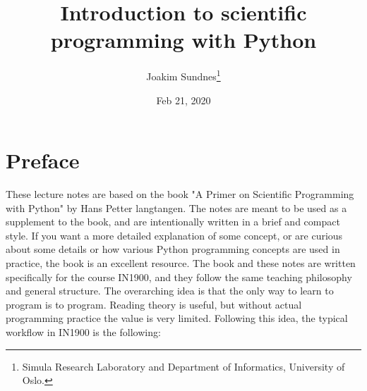 \documentclass[graybox,envcountchap,sectrefs,final]{svmonodo}
\begin{document}

\newcommand{\exercisesection}[1]{\subsection*{#1}}






\frontmatter
\setcounter{page}{3}
\pagestyle{headings}



\title{Introduction to scientific programming with Python}


\author{Joakim Sundnes\footnote{Simula Research Laboratory and Department of Informatics, University of Oslo.}}


\date{Feb 21, 2020}
\maketitle

\chapter*{Preface}
\label{ch:preface}

These lecture notes are based on the book "A Primer on Scientific Programming with Python"
by Hans Petter langtangen. The notes are meant to be used as a supplement to the book, and
are intentionally written in a brief and compact style. If you want a more detailed explanation
of some concept, or are curious about some details or how various Python programming concepts are
used in practice, the book is an excellent resource. The book and these notes are written specifically
for the course IN1900, and they follow the same teaching philosophy and general structure. The overarching idea
is that the only way to learn to program is to program. Reading theory is useful, but without actual programming
practice the value is very limited. Following this idea, the typical workflow in IN1900 is the following:
\end{document}
